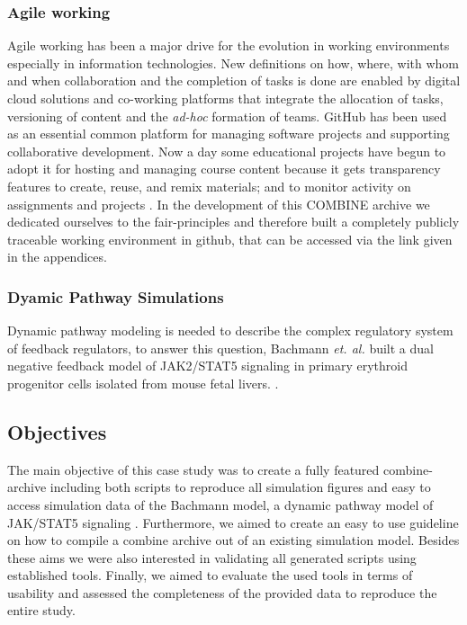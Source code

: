 

\subsubsection*{Agile working}
Agile working has been a major drive for the evolution in working environments especially in information technologies. New definitions on how, where, with whom and when collaboration and the completion of tasks is done are enabled by digital cloud solutions and co-working platforms that integrate the allocation of tasks, versioning of content and the \textit{ad-hoc} formation of teams. GitHub has been used as an essential common platform for managing software projects and supporting collaborative development. Now a day some educational projects have begun to adopt it for hosting and managing course content because it gets transparency features to create, reuse, and remix materials; and to monitor activity on assignments and projects \cite{github}. In the development of this COMBINE archive we dedicated ourselves to the \ac{fair}-principles and therefore built a completely publicly traceable working environment in github, that can be accessed via the link given in the appendices.

\subsubsection*{Dyamic Pathway Simulations}
Dynamic pathway modeling is needed to describe the complex regulatory system of feedback regulators, to answer this question, Bachmann \textit{et. al.} built a dual negative feedback model of JAK2/STAT5 signaling in primary erythroid progenitor cells isolated from mouse fetal livers. \cite{bachmannmodel}.

\subsection*{Objectives}
The main objective of this case study was to create a fully featured \acs{combine}-archive including both scripts to reproduce all simulation figures and easy to access simulation data of the Bachmann model, a dynamic pathway model of JAK/STAT5 signaling \cite{bachmannmodel}. Furthermore, we aimed to create an easy to use guideline on how to compile a \acs{combine} archive out of an existing simulation model. Besides these aims we were also interested in validating all generated scripts using established tools. Finally, we aimed to evaluate the used tools in terms of usability and assessed the completeness of the provided data to reproduce the entire study.

